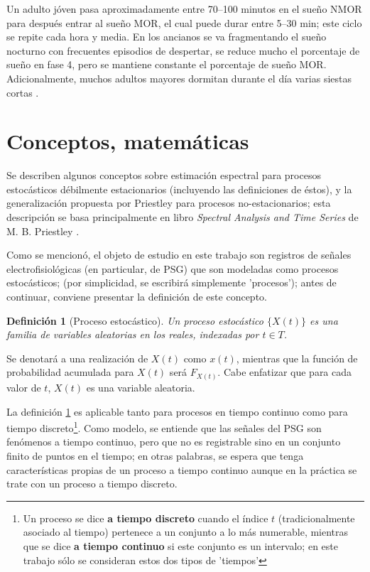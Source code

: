 \documentclass[12pt,a4paper]{mitthesis}
\newtheorem{defn}{Definici\'on}
\begin{document}
Un adulto j\'oven pasa aproximadamente entre 70--100 minutos en el sue\~no NMOR para despu\'es 
entrar al sue\~no MOR, el cual puede durar entre 5--30 min; este ciclo se repite cada hora y media.
En los ancianos se va fragmentando el sue\~no nocturno con frecuentes episodios de despertar, se 
reduce mucho el porcentaje de sue\~no en fase 4, pero se mantiene constante el porcentaje de 
sue\~no MOR. Adicionalmente, muchos adultos mayores dormitan durante el d\'ia varias siestas 
cortas \cite{CarrilloMora}.


\section{Conceptos, matem\'aticas}

Se describen algunos conceptos sobre estimaci\'on espectral para procesos estoc\'asticos 
d\'ebilmente estacionarios (incluyendo las definiciones de \'estos), y la generalizaci\'on 
propuesta por Priestley para procesos no-estacionarios; esta descripci\'on se basa principalmente 
en libro \textit{Spectral Analysis and Time Series} de M. B. Priestley \cite{Priestley81}.

Como se mencion\'o, el objeto de estudio en este trabajo son registros de se\~nales
electrofisiol\'ogicas (en particular, de PSG) que son modeladas como procesos estoc\'asticos; (por 
simplicidad, se escribir\'a simplemente 'procesos'); antes de continuar, conviene presentar la 
definici\'on de este concepto. 

\begin{defn}[Proceso estoc\'astico]
Un proceso estoc\'astico $\{ X(t) \}$ es una familia de variables aleatorias en los reales, 
indexadas por $t \in T$.
\label{proc_estocastico}
\end{defn}

Se denotar\'a a una realizaci\'on de $X(t)$ como $x(t)$, mientras que la funci\'on de probabilidad 
acumulada para $X(t)$ ser\'a $F_{X(t)}$. Cabe enfatizar que para cada valor de $t$, $X(t)$ es una 
variable  aleatoria.

La definici\'on \ref{proc_estocastico} es aplicable tanto para procesos en tiempo continuo como 
para tiempo discreto\footnote{Un proceso se dice \textbf{a tiempo discreto} cuando el \'indice $t$ 
(tradicionalmente asociado al tiempo) pertenece a un conjunto a lo m\'as numerable, mientras que se 
dice \textbf{a tiempo continuo} si este conjunto es un intervalo; en este trabajo s\'olo se 
consideran estos dos tipos de 'tiempos'}.
Como modelo, se entiende que las se\~nales del PSG son fen\'omenos a tiempo continuo, pero que no
es registrable sino en un conjunto finito de puntos en el tiempo; en otras palabras, se espera que 
tenga caracter\'isticas propias de un proceso a tiempo continuo aunque en la pr\'actica se trate 
con un proceso a tiempo discreto.
\end{document}
